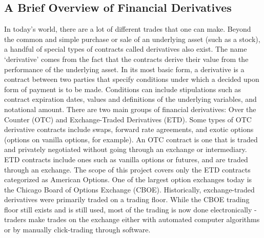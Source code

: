 \documentclass[12pt, a4paper, notitlepage]{article}
\numberwithin{equation}{subsection}
\numberwithin{figure}{subsection}
\numberwithin{table}{subsection}
\newcommand{\newpar}{\newline \newline}
\begin{document}
\subsection{A Brief Overview of Financial Derivatives}
In today's world, there are a lot of different trades that one can make.  Beyond the common and simple purchase or sale of an underlying asset (such as a stock), a handful of special types of contracts called derivatives also exist.  The name `derivative' comes from the fact that the contracts derive their value from the performance of the underlying asset.  In its most basic form, a derivative is a contract between two parties that specify conditions under which a decided upon form of payment is to be made.  Conditions can include stipulations such as contract expiration dates, values and definitions of the underlying variables, and notational amount.
\newpar
There are two main groups of financial derivatives: Over the Counter (OTC) and Exchange-Traded Derivatives (ETD).  Some types of OTC derivative contracts include swaps, forward rate agreements, and exotic options (options on vanilla options, for example).  An OTC contract is one that is traded and privately negotiated without going through an exchange or intermediary.  ETD contracts include ones such as vanilla options or futures, and are traded through an exchange.  The scope of this project covers only the ETD contracts categorized as American Options.
\newpar
One of the largest option exchanges today is the Chicago Board of Options Exchange (CBOE).  Historically, exchange-traded derivatives were primarily traded on a trading floor.  While the CBOE trading floor still exists and is still used, most of the trading is now done electronically - traders make trades on the exchange either with automated computer algorithms or by manually click-trading through software.
\end{document}
